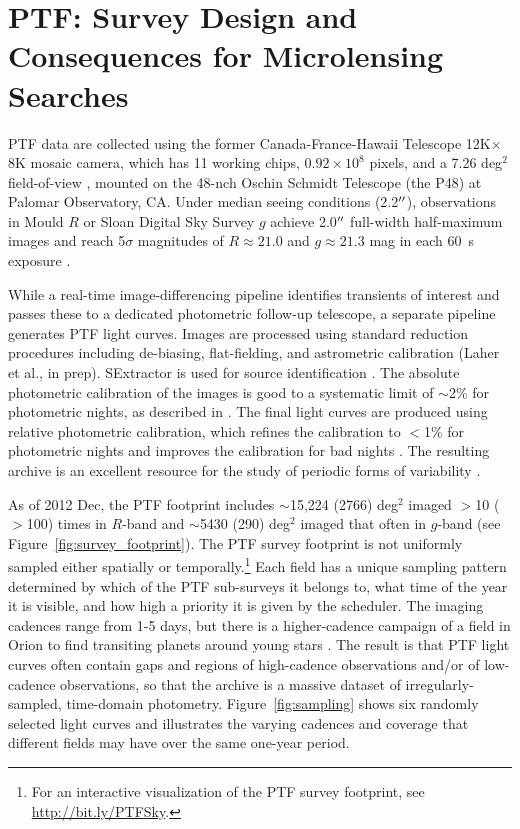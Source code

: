 \documentclass{emulateapj}
\begin{document}
\section{PTF: Survey Design and Consequences for Microlensing Searches}\label{sec:ptf} 
PTF data are collected using the former Canada-France-Hawaii Telescope 12K$\times$8K mosaic camera, which has 11 working chips, $0.92\times10^8$ pixels, and a 7.26 deg$^2$ field-of-view \citep{rahmer2008}, mounted on the 48-nch Oschin Schmidt Telescope (the P48) at Palomar Observatory, CA. Under median seeing conditions (2.2$\mbox{$^{\prime\prime}$}$), observations in Mould $R$ or Sloan Digital Sky Survey \citep[SDSS;][]{york00} $g$ achieve 2.0$\mbox{$^{\prime\prime}$}$ full-width half-maximum images and reach 5$\sigma$ magnitudes of $R \approx 21.0$ and $g \approx 21.3$ mag in each 60~s exposure \citep{nick2009,rau2009,nick2010}. 

While a real-time image-differencing pipeline identifies transients of interest and passes these to a dedicated photometric follow-up telescope, a separate pipeline generates PTF light curves. Images are processed using standard reduction procedures including de-biasing, flat-fielding, and astrometric calibration (Laher et al., in prep). SExtractor is used for source identification \citep{bertin96}. The absolute photometric calibration of the images is good to a systematic limit of $\sim$2\% for photometric nights, as described in \cite{ofek2012}.  The final light curves are produced using relative photometric calibration, which refines the calibration to $<$1\% for photometric nights and improves the calibration for bad nights \citep[Levitan et al., in prep; for algorithm details see][]{levitan2011, ofek2012}. The resulting archive is an excellent resource for the study of periodic forms of variability \citep[e.g., stellar or asteroid rotation;][]{agueros11,polishook2012}. 

As of 2012 Dec, the PTF footprint includes $\sim$15,224 (2766) deg$^2$ imaged $>$10 ($>$100) times in $R$-band and $\sim$5430 (290) deg$^2$ imaged that often in $g$-band (see Figure~\ref{fig:survey_footprint}). The PTF survey footprint is not uniformly sampled either spatially or temporally.\footnote{For an interactive visualization of the PTF survey footprint, see \url{http://bit.ly/PTFSky}.} Each field has a unique sampling pattern determined by which of the PTF sub-surveys it belongs to, what time of the year it is visible, and how high a priority it is given by the scheduler. The imaging cadences range from 1-5 days, but there is a higher-cadence campaign of a field in Orion to find transiting planets around young stars \citep{nick2009}. The result is that PTF light curves often contain gaps and regions of high-cadence observations and/or of low-cadence observations, so that the archive is a massive dataset of irregularly-sampled, time-domain photometry. Figure~\ref{fig:sampling} shows six randomly selected light curves and illustrates the varying cadences and coverage that different fields may have over the same one-year period. 
\end{document}
